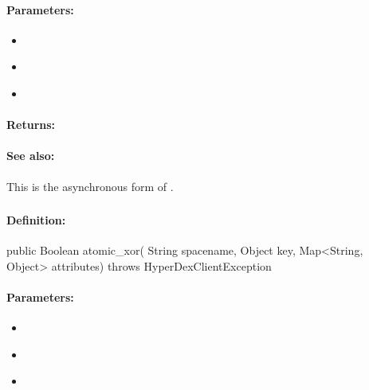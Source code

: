 \paragraph{Parameters:}
\begin{itemize}[noitemsep]
\item {}\\

\item {}\\

\item {}\\

\end{itemize}

\paragraph{Returns:}


\paragraph{See also:}  This is the asynchronous form of .

\pagebreak
\subsubsection{}
\label{api:java:atomic_xor}


\paragraph{Definition:}
\begin{javacode}
public Boolean atomic_xor(
        String spacename,
        Object key,
        Map<String, Object> attributes) throws HyperDexClientException
\end{javacode}

\paragraph{Parameters:}
\begin{itemize}[noitemsep]
\item {}\\

\item {}\\

\item {}\\

\end{itemize}

